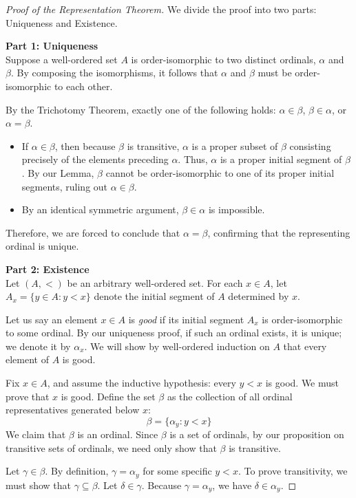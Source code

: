 \documentclass[11pt]{article}
\begin{document}
\begin{proof}[Proof of the Representation Theorem]
We divide the proof into two parts: Uniqueness and Existence.

\medskip
\noindent\textbf{Part 1: Uniqueness}\\
Suppose a well-ordered set $A$ is order-isomorphic to two distinct ordinals, $\alpha$ and $\beta$. By composing the isomorphisms, it follows that $\alpha$ and $\beta$ must be order-isomorphic to each other.

By the Trichotomy Theorem, exactly one of the following holds: $\alpha \in \beta$, $\beta \in \alpha$, or $\alpha = \beta$. 
\begin{itemize}
    \item If $\alpha \in \beta$, then because $\beta$ is transitive, $\alpha$ is a proper subset of $\beta$ consisting precisely of the elements preceding $\alpha$. Thus, $\alpha$ is a proper initial segment of $\beta$. By our Lemma, $\beta$ cannot be order-isomorphic to one of its proper initial segments, ruling out $\alpha \in \beta$.
    \item By an identical symmetric argument, $\beta \in \alpha$ is impossible.
\end{itemize}
Therefore, we are forced to conclude that $\alpha = \beta$, confirming that the representing ordinal is unique.

\medskip
\noindent\textbf{Part 2: Existence}\\
Let $(A,<)$ be an arbitrary well-ordered set. For each $x \in A$, let $A_x = \{y \in A : y < x\}$ denote the initial segment of $A$ determined by $x$. 

Let us say an element $x \in A$ is \textit{good} if its initial segment $A_x$ is order-isomorphic to some ordinal. By our uniqueness proof, if such an ordinal exists, it is unique; we denote it by $\alpha_x$. We will show by well-ordered induction on $A$ that every element of $A$ is good.

Fix $x \in A$, and assume the inductive hypothesis: every $y < x$ is good. We must prove that $x$ is good. Define the set $\beta$ as the collection of all ordinal representatives generated below $x$:
\[
\beta = \{\alpha_y : y < x\}
\]
We claim that $\beta$ is an ordinal. Since $\beta$ is a set of ordinals, by our proposition on transitive sets of ordinals, we need only show that $\beta$ is transitive.

Let $\gamma \in \beta$. By definition, $\gamma = \alpha_y$ for some specific $y < x$. To prove transitivity, we must show that $\gamma \subseteq \beta$. Let $\delta \in \gamma$. Because $\gamma = \alpha_y$, we have $\delta \in \alpha_y$. 


\end{proof}
\end{document}
